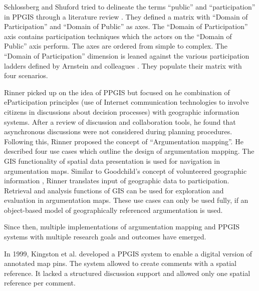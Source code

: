 Schlossberg and Shuford tried to delineate the terms ``public'' and ``participation'' in PPGIS through a literature review \cite{Schlossberg2005_PPGIS}. They defined a matrix with ``Domain of Participation'' and ``Domain of Public'' as axes. The ``Domain of Participation'' axis contains participation techniques which the actors on the ``Domain of Public'' axis perform. The axes are ordered from simple to complex. The ``Domain of Participation'' dimension is leaned against the various participation ladders defined by Arnstein and colleagues \cite{Arnstein1969_citizen_participation,Wiedemann1993355,Connor1988_new_ladder}. They populate their matrix with four scenarios.

Rinner \cite{Rinner_ArgumentationMaps} picked up on the idea of PPGIS but focused on he combination of eParticipation principles (use of Internet communication technologies to involve citizens in discussions about decision processes) with geographic information systems. After a review of discussion and collaboration tools, he found that asynchronous discussions were not considered during planning procedures. Following this, Rinner proposed the concept of ``Argumentation mapping''. He described four use cases which outline the design of argumentation mapping. The GIS functionality of spatial data presentation is used for navigation in argumentation maps. Similar to Goodchild's concept of volunteered geographic information \cite{goodchild2007citizens}, Rinner translates input of geographic data to participation. Retrieval and analysis functions of GIS can be used for exploration and evaluation in argumentation maps. These use cases can only be used fully, if an object-based model of geographically referenced argumentation is used.

Since then, multiple implementations of argumentation mapping and PPGIS systems with multiple research goals and outcomes have emerged.

In 1999, Kingston et al. \cite{kingston1999gis} developed a PPGIS system to enable a digital version of annotated map pins. The system allowed to create comments with a spatial reference. It lacked a structured discussion support and allowed only one spatial reference per comment.



